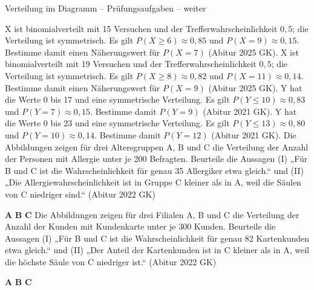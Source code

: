 \begin{aufgabe}{Verteilung im Diagramm – Prüfungsaufgaben – weiter}
\begin{teile}
\teil X ist binomialverteilt mit 15 Versuchen und der Trefferwahrscheinlichkeit $0{,}5$; die Verteilung ist symmetrisch. Es gilt $P(X \ge 6) \approx 0{,}85$ und $P(X = 9) \approx 0{,}15$. Bestimme damit einen Näherungswert für $P(X = 7)$ \hfill (Abitur 2025 GK). \leerfeld
\teil X ist binomialverteilt mit 19 Versuchen und der Trefferwahrscheinlichkeit $0{,}5$; die Verteilung ist symmetrisch. Es gilt $P(X \ge 8) \approx 0{,}82$ und $P(X = 11) \approx 0{,}14$. Bestimme damit einen Näherungswert für $P(X = 9)$ \hfill (Abitur 2025 GK). \leerfeld
\teil Y hat die Werte 0 bis 17 und eine symmetrische Verteilung. Es gilt $P(Y \le 10) \approx 0{,}83$ und $P(Y = 7) \approx 0{,}15$. Bestimme damit $P(Y = 9)$ \hfill (Abitur 2021 GK). \leerfeld
\teil Y hat die Werte 0 bis 23 und eine symmetrische Verteilung. Es gilt $P(Y \le 13) \approx 0{,}80$ und $P(Y = 10) \approx 0{,}14$. Bestimme damit $P(Y = 12)$ \hfill (Abitur 2021 GK). \leerfeld
\teil Die Abbildungen zeigen für drei Altersgruppen A, B und C die Verteilung der Anzahl der Personen mit Allergie unter je 200 Befragten. Beurteile die Aussagen (I) „Für B und C ist die Wahrscheinlichkeit für genau 35 Allergiker etwa gleich.“ und (II) „Die Allergiewahrscheinlichkeit ist in Gruppe C kleiner als in A, weil die Säulen von C niedriger sind.“ \hfill (Abitur 2022 GK)

\textbf{A}  \quad \textbf{B}  \quad \textbf{C} 
\teil Die Abbildungen zeigen für drei Filialen A, B und C die Verteilung der Anzahl der Kunden mit Kundenkarte unter je 300 Kunden. Beurteile die Aussagen (I) „Für B und C ist die Wahrscheinlichkeit für genau 82 Kartenkunden etwa gleich.“ und (II) „Der Anteil der Kartenkunden ist in C kleiner als in A, weil die höchste Säule von C niedriger ist.“ \hfill (Abitur 2022 GK)

\textbf{A}  \quad \textbf{B}  \quad \textbf{C} 
\end{teile}
\end{aufgabe}
